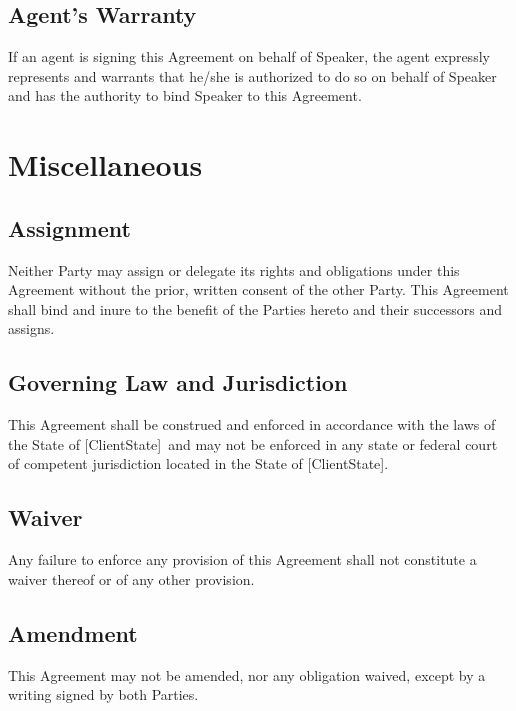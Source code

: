 \documentclass[a4paper,12pt]{article} %
\newcommand{\ClientState}{[ClientState]}
\begin{document}
\subsection{Agent's Warranty}

If an agent is signing this Agreement on behalf of Speaker, the agent expressly represents and warrants that he/she is authorized to do so on behalf of Speaker and has the authority to bind Speaker to this Agreement.



\section{Miscellaneous}

\subsection{Assignment}

Neither Party may assign or delegate its rights and obligations under this Agreement without the prior, written consent of the other Party. This Agreement shall bind and inure to the benefit of the Parties hereto and their successors and assigns.

\subsection{Governing Law and Jurisdiction}

This Agreement shall be construed and enforced in accordance with the laws of the State of \ClientState ~and may not be enforced in any state or federal court of competent jurisdiction located in the State of \ClientState.

\subsection{Waiver}

Any failure to enforce any provision of this Agreement shall not constitute a waiver thereof or of any other provision.

\subsection{Amendment}

This Agreement may not be amended, nor any obligation waived, except by a writing signed by both Parties.
\end{document}
